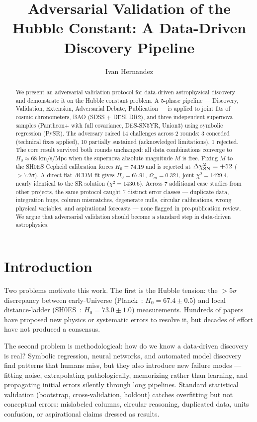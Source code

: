 \documentclass[twocolumn]{aastex631}
\begin{document}
\title{Adversarial Validation of the Hubble Constant: A Data-Driven Discovery Pipeline}

\author{Ivan Hernandez}

\begin{abstract}
We present an adversarial validation protocol for data-driven astrophysical
discovery and demonstrate it on the Hubble constant problem.
A 5-phase pipeline --- Discovery, Validation, Extension, Adversarial Debate,
Publication --- is applied to joint fits of cosmic chronometers, BAO (SDSS +
DESI DR2), and three independent supernova samples (Pantheon+ with full
covariance, DES-SN5YR, Union3) using symbolic regression (PySR).
The adversary raised 14 challenges across 2 rounds: 3 conceded (technical
fixes applied), 10 partially sustained (acknowledged limitations), 1 rejected.
The core result survived both rounds unchanged: all data combinations
converge to $H_0 \approx 68$ km/s/Mpc when the
supernova absolute magnitude $M$ is free.  Fixing $M$ to the SH0ES Cepheid
calibration forces $H_0=74.19$ and is rejected at
$\Delta\chi^2_{\rm SN}=+52$ ($>7.2\sigma$).
A direct flat $\Lambda$CDM fit gives $H_0=67.91$, $\Omega_m=0.321$, joint
$\chi^2=1429.4$, nearly identical to the SR solution ($\chi^2=1430.6$).
Across 7 additional case studies from other projects, the same protocol
caught 7 distinct error classes --- duplicate data, integration bugs,
column mismatches, degenerate nulls, circular calibrations, wrong
physical variables, and aspirational forecasts --- none flagged in
pre-publication review.
We argue that adversarial validation should become a standard step in
data-driven astrophysics.
\end{abstract}

\section{Introduction}

Two problems motivate this work.  The first is the Hubble tension: the
$>5\sigma$ discrepancy between early-Universe
(Planck~\cite{planck2018}: $H_0=67.4\pm0.5$) and local distance-ladder
(SH0ES~\cite{sh0es2024}: $H_0=73.0\pm1.0$) measurements.  Hundreds of
papers have proposed new physics or systematic errors to resolve it, but
decades of effort have not produced a consensus.

The second problem is methodological: how do we know a data-driven
discovery is real?  Symbolic regression, neural networks, and automated
model discovery find patterns that humans miss, but they also introduce
new failure modes --- fitting noise, extrapolating pathologically,
memorizing rather than learning, and propagating initial errors silently
through long pipelines.  Standard statistical validation (bootstrap,
cross-validation, holdout) catches overfitting but not conceptual errors:
mislabeled columns, circular reasoning, duplicated data, units confusion,
or aspirational claims dressed as results.
\end{document}
